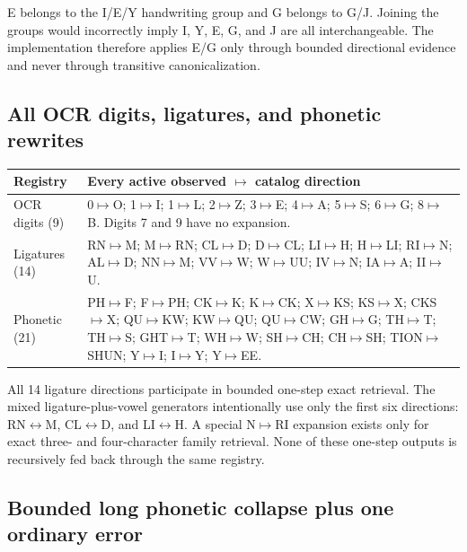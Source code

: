 \documentclass[10pt,a4paper]{article}
\begin{document}
\begin{safetybox}[title=Why E/G is kept separate]
E belongs to the I/E/Y handwriting group and G belongs to G/J. Joining the
groups would incorrectly imply I, Y, E, G, and J are all interchangeable.
The implementation therefore applies E/G only through bounded directional
evidence and never through transitive canonicalization.
\end{safetybox}

\subsection{All OCR digits, ligatures, and phonetic rewrites}

\begin{tabularx}{\textwidth}{@{}L{30mm}Y@{}}
\toprule
Registry & Every active observed $\mapsto$ catalog direction \\
\midrule
OCR digits (9) & 0$\mapsto$O; 1$\mapsto$I; 1$\mapsto$L;
2$\mapsto$Z; 3$\mapsto$E; 4$\mapsto$A; 5$\mapsto$S;
6$\mapsto$G; 8$\mapsto$B. Digits 7 and 9 have no expansion. \\
Ligatures (14) & RN$\mapsto$M; M$\mapsto$RN; CL$\mapsto$D;
D$\mapsto$CL; LI$\mapsto$H; H$\mapsto$LI; RI$\mapsto$N;
AL$\mapsto$D; NN$\mapsto$M; VV$\mapsto$W; W$\mapsto$UU;
IV$\mapsto$N; IA$\mapsto$A; II$\mapsto$U. \\
Phonetic (21) & PH$\mapsto$F; F$\mapsto$PH; CK$\mapsto$K;
K$\mapsto$CK; X$\mapsto$KS; KS$\mapsto$X; CKS$\mapsto$X;
QU$\mapsto$KW; KW$\mapsto$QU; QU$\mapsto$CW; GH$\mapsto$G;
TH$\mapsto$T; TH$\mapsto$S; GHT$\mapsto$T; WH$\mapsto$W;
SH$\mapsto$CH; CH$\mapsto$SH; TION$\mapsto$SHUN;
Y$\mapsto$I; I$\mapsto$Y; Y$\mapsto$EE. \\
\bottomrule
\end{tabularx}

All 14 ligature directions participate in bounded one-step exact retrieval.
The mixed ligature-plus-vowel generators intentionally use only the first six
directions: RN$\leftrightarrow$M, CL$\leftrightarrow$D, and
LI$\leftrightarrow$H. A special N$\mapsto$RI expansion exists only for exact
three- and four-character family retrieval. None of these one-step outputs is
recursively fed back through the same registry.

\subsection{Bounded long phonetic collapse plus one ordinary error}
\end{document}

